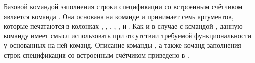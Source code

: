 \fussy
Базовой командой заполнения строки спецификации со встроенным счётчиком является команда
. Она основана на команде  и
принимает семь аргументов, которые печатаются в колонках
, ,
, ,
,  и
. Как и в случае с командой
, данную команду имеет смысл использовать при отсутствии
требуемой функциональности у основанных на ней команд. Описание команды
, а также команд заполнения строк спецификации со
встроенным счётчиком приведено в .\sloppy

\fussy
\clearpage



